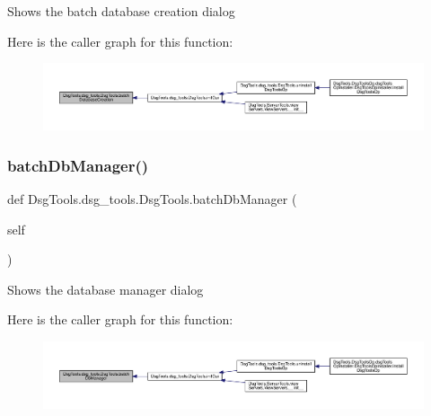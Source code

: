 \begin{DoxyVerb}Shows the batch database creation dialog
\end{DoxyVerb}
 Here is the caller graph for this function\+:
\nopagebreak
\begin{figure}[H]
\begin{center}
\leavevmode
\includegraphics[width=350pt]{class_dsg_tools_1_1dsg__tools_1_1_dsg_tools_a8a9507bd642a3a8774e32fcf9f66f45d_icgraph}
\end{center}
\end{figure}
\mbox{\label{class_dsg_tools_1_1dsg__tools_1_1_dsg_tools_a40c7799a46e2b15d7a6918d91574d6b9}} 
\subsubsection{\texorpdfstring{batch\+Db\+Manager()}{batchDbManager()}}
{\footnotesize\ttfamily def Dsg\+Tools.\+dsg\+\_\+tools.\+Dsg\+Tools.\+batch\+Db\+Manager (\begin{DoxyParamCaption}\item[{}]{self }\end{DoxyParamCaption})}

\begin{DoxyVerb}Shows the database manager dialog
\end{DoxyVerb}
 Here is the caller graph for this function\+:
\nopagebreak
\begin{figure}[H]
\begin{center}
\leavevmode
\includegraphics[width=350pt]{class_dsg_tools_1_1dsg__tools_1_1_dsg_tools_a40c7799a46e2b15d7a6918d91574d6b9_icgraph}
\end{center}
\end{figure}
\mbox{\label{class_dsg_tools_1_1dsg__tools_1_1_dsg_tools_a95aadbdfdaefe737fed7d2b7352f2d1e}} 
